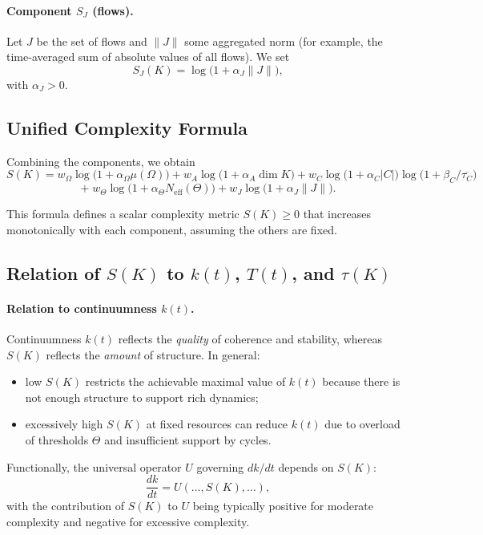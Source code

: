 \paragraph{Component \texorpdfstring{\(S_J\)}{S_J} (flows).}
Let \(J\) be the set of flows and \(\|J\|\) some aggregated norm (for example, the time-averaged sum of absolute values of all flows).
We set
\[
  S_J(K) = \log\bigl(1+\alpha_J \|J\|\bigr),
\]
with \(\alpha_J>0\).

\subsection{Unified Complexity Formula}

Combining the components, we obtain
\begin{equation}
  S(K) =
  w_\Omega \log\bigl(1+\alpha_\Omega \mu(\Omega)\bigr)
  + w_A \log\bigl(1+\alpha_A \dim K\bigr)
  + w_C \log\bigl(1+\alpha_C |C|\bigr)\log\bigl(1+\beta_C/\overline{\tau_C}\bigr)
\end{equation}
\[
  +\; w_\Theta \log\bigl(1+\alpha_\Theta N_{\mathrm{eff}}(\Theta)\bigr)
  + w_J \log\bigl(1+\alpha_J \|J\|\bigr).
\]

This formula defines a scalar complexity metric \(S(K)\ge 0\) that increases monotonically with each component, assuming the others are fixed.

\subsection{Relation of \(S(K)\) to \(k(t)\), \(T(t)\), and \(\tau(K)\)}

\paragraph{Relation to continuumness \(k(t)\).}
Continuumness \(k(t)\) reflects the \emph{quality} of coherence and stability, whereas \(S(K)\) reflects the \emph{amount} of structure.
In general:
\begin{itemize}
  \item low \(S(K)\) restricts the achievable maximal value of \(k(t)\) because there is not enough structure to support rich dynamics;
  \item excessively high \(S(K)\) at fixed resources can reduce \(k(t)\) due to overload of thresholds \(\Theta\) and insufficient support by cycles.
\end{itemize}
Functionally, the universal operator \(U\) governing \(dk/dt\) depends on \(S(K)\):
\[
  \frac{dk}{dt} = U(\ldots,S(K),\ldots),
\]
with the contribution of \(S(K)\) to \(U\) being typically positive for moderate complexity and negative for excessive complexity.

